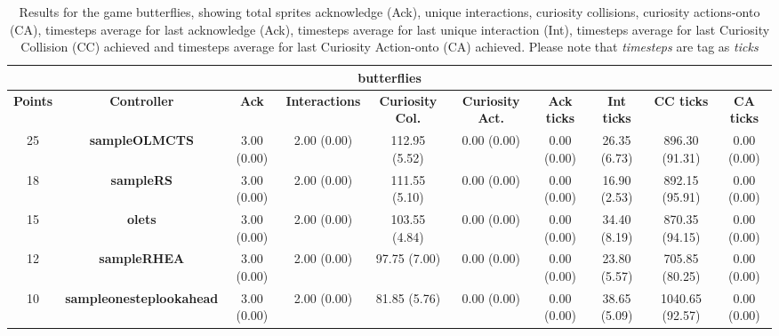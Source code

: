 \begin{table*}[!t]
\begin{center}
\begin{adjustbox}{width=1\textwidth}
\begin{tabular}{|c|c|c|c|c|c|c|c|c|c|}
\multicolumn{10}{c}{\textbf{butterflies}}\\
\hline
\textbf{Points} & \textbf{Controller} & \textbf{Ack} & \textbf{Interactions} & \textbf{Curiosity Col.} & \textbf{Curiosity Act.} & \textbf{Ack ticks} & \textbf{Int ticks} & \textbf{CC ticks} & \textbf{CA ticks}\\
\hline
25 & \textbf{sampleOLMCTS} & 3.00 (0.00) & 2.00 (0.00) & 112.95 (5.52) & 0.00 (0.00) & 0.00 (0.00) & 26.35 (6.73) & 896.30 (91.31) & 0.00 (0.00)
 \\
\hline
18 & \textbf{sampleRS} & 3.00 (0.00) & 2.00 (0.00) & 111.55 (5.10) & 0.00 (0.00) & 0.00 (0.00) & 16.90 (2.53) & 892.15 (95.91) & 0.00 (0.00)
 \\
\hline
15 & \textbf{olets} & 3.00 (0.00) & 2.00 (0.00) & 103.55 (4.84) & 0.00 (0.00) & 0.00 (0.00) & 34.40 (8.19) & 870.35 (94.15) & 0.00 (0.00)
 \\
\hline
12 & \textbf{sampleRHEA} & 3.00 (0.00) & 2.00 (0.00) & 97.75 (7.00) & 0.00 (0.00) & 0.00 (0.00) & 23.80 (5.57) & 705.85 (80.25) & 0.00 (0.00)
 \\
\hline
10 & \textbf{sampleonesteplookahead} & 3.00 (0.00) & 2.00 (0.00) & 81.85 (5.76) & 0.00 (0.00) & 0.00 (0.00) & 38.65 (5.09) & 1040.65 (92.57) & 0.00 (0.00)
 \\
\hline
\end{tabular}
\end{adjustbox}
\caption{Results for the game butterflies, showing total sprites acknowledge (Ack), unique interactions, curiosity collisions, curiosity actions-onto (CA), timesteps average for last acknowledge (Ack),  timesteps average for last unique interaction (Int), timesteps average for last Curiosity Collision (CC) achieved and timesteps average for last Curiosity Action-onto (CA) achieved. Please note that \textit{timesteps} are tag as \textit{ticks}}
\label{tab:weights}
\end{center}
\end{table*}
